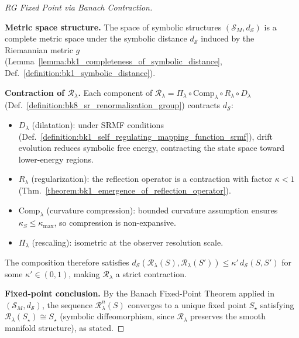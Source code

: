 \begin{proof}[RG Fixed Point via Banach Contraction]
\label{proof:bk8_sketch_convergence_to_fixed_by_banach}
\leavevmode

\textbf{Metric space structure.}
The space of symbolic structures $(\mathscr{S}_M, d_{\mathscr{S}})$ is a complete metric
space under the symbolic distance $d_{\mathscr{S}}$ induced by the Riemannian metric $g$
(Lemma~\ref{lemma:bk1_completeness_of_symbolic_distance},
Def.~\ref{definition:bk1_symbolic_distance}).

\textbf{Contraction of $\mathcal{R}_\lambda$.}
Each component of $\mathcal{R}_\lambda = \Pi_\lambda \circ \mathrm{Comp}_\lambda \circ
R_\lambda \circ D_\lambda$ (Def.~\ref{definition:bk8_sr_renormalization_group}) contracts
$d_{\mathscr{S}}$:
\begin{itemize}
\item $D_\lambda$ (dilatation): under SRMF conditions
  (Def.~\ref{definition:bk1_self_regulating_mapping_function_srmf}), drift evolution
  reduces symbolic free energy, contracting the state space toward lower-energy regions.
\item $R_\lambda$ (regularization): the reflection operator is a contraction with factor
  $\kappa < 1$ (Thm.~\ref{theorem:bk1_emergence_of_reflection_operator}).
\item $\mathrm{Comp}_\lambda$ (curvature compression): bounded curvature assumption
  ensures $\kappa_S \leq \kappa_{\max}$, so compression is non-expansive.
\item $\Pi_\lambda$ (rescaling): isometric at the observer resolution scale.
\end{itemize}
The composition therefore satisfies $d_{\mathscr{S}}(\mathcal{R}_\lambda(S),
\mathcal{R}_\lambda(S')) \leq \kappa'\,d_{\mathscr{S}}(S,S')$ for some $\kappa' \in (0,1)$,
making $\mathcal{R}_\lambda$ a strict contraction.

\textbf{Fixed-point conclusion.}
By the Banach Fixed-Point Theorem applied in $(\mathscr{S}_M, d_{\mathscr{S}})$, the
sequence $\mathcal{R}_\lambda^n(S)$ converges to a unique fixed point $S_\star$
satisfying $\mathcal{R}_\lambda(S_\star) \cong S_\star$ (symbolic diffeomorphism, since
$\mathcal{R}_\lambda$ preserves the smooth manifold structure), as stated.
\end{proof}
